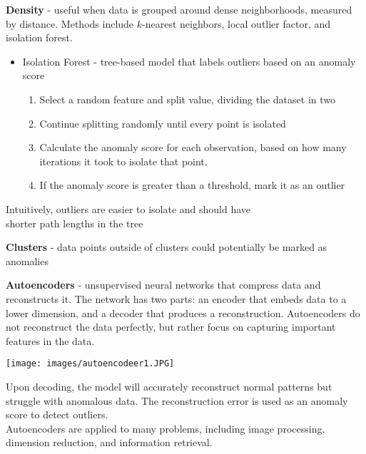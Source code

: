 \documentclass[10pt,landscape]{article}
\begin{document}
\begin{multicols}{3}
\textbf{Density} - useful when data is grouped around dense neighborhoods, measured by distance. Methods include $k$-nearest neighbors, local outlier factor, and isolation forest.
\begin{itemize}[label={--},leftmargin=4mm]
\itemsep -.4mm 
\item Isolation Forest - tree-based model that labels outliers based on an anomaly score\\
\vspace{-1.5mm}
\begin{enumerate}[leftmargin=4mm]
\itemsep -.4mm 
\item Select a random feature and split value, dividing the dataset in two
\item Continue splitting randomly until every point is isolated
\item Calculate the anomaly score for each observation, based on how many iterations it took to isolate that point.
\item If the anomaly score is greater than a threshold, mark it as an outlier
\end{enumerate}
\end{itemize}
\vspace{-2.5mm}
\hspace{4mm}Intuitively, outliers are easier to isolate and should have\\\hspace{4mm}shorter path lengths in the tree

\vspace{1mm}
\textbf{Clusters} - data points outside of clusters could potentially be marked as anomalies

\vspace{1mm}
\textbf{Autoencoders} - unsupervised neural networks that compress data and reconstructs it. The network has two parts: an encoder that embeds data to a lower dimension, and a decoder that produces a reconstruction. Autoencoders do not reconstruct the data perfectly, but rather focus on capturing important features in the data.
\begin{center}
\vspace{-2mm}
    \texttt{[image: images/autoencodeer1.JPG]}
    \vspace{-2mm}
\end{center}
Upon decoding, the model will accurately reconstruct normal patterns but struggle with anomalous data. The reconstruction error is used as an anomaly score to detect outliers.\\
\smallskip
Autoencoders are applied to many problems, including image processing, dimension reduction, and information retrieval.





\end{multicols}
\end{document}
